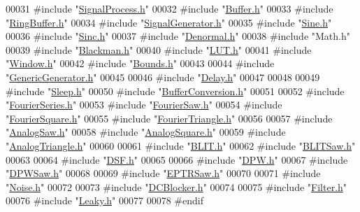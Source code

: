 \begin{DoxyCode}
00031 \textcolor{preprocessor}{#include "\hyperlink{_signal_process_8h}{SignalProcess.h}"}
00032 \textcolor{preprocessor}{#include "\hyperlink{_buffer_8h}{Buffer.h}"}
00033 \textcolor{preprocessor}{#include "\hyperlink{_ring_buffer_8h}{RingBuffer.h}"}
00034 \textcolor{preprocessor}{#include "\hyperlink{_signal_generator_8h}{SignalGenerator.h}"}
00035 \textcolor{preprocessor}{#include "\hyperlink{_sine_8h}{Sine.h}"}
00036 \textcolor{preprocessor}{#include "\hyperlink{_sinc_8h}{Sinc.h}"}
00037 \textcolor{preprocessor}{#include "\hyperlink{_denormal_8h}{Denormal.h}"}
00038 \textcolor{preprocessor}{#include "Math.h"}
00039 \textcolor{preprocessor}{#include "\hyperlink{_blackman_8h}{Blackman.h}"}
00040 \textcolor{preprocessor}{#include "\hyperlink{_l_u_t_8h}{LUT.h}"}
00041 \textcolor{preprocessor}{#include "\hyperlink{_window_8h}{Window.h}"}
00042 \textcolor{preprocessor}{#include "\hyperlink{_bounds_8h}{Bounds.h}"}
00043 
00044 \textcolor{preprocessor}{#include "\hyperlink{_generic_generator_8h}{GenericGenerator.h}"}
00045 
00046 \textcolor{preprocessor}{#include "\hyperlink{_delay_8h}{Delay.h}"}
00047 
00048 
00049 \textcolor{preprocessor}{#include "\hyperlink{_sleep_8h}{Sleep.h}"}
00050 \textcolor{preprocessor}{#include "\hyperlink{_buffer_conversion_8h}{BufferConversion.h}"}
00051 
00052 \textcolor{preprocessor}{#include "\hyperlink{_fourier_series_8h}{FourierSeries.h}"}
00053 \textcolor{preprocessor}{#include "\hyperlink{_fourier_saw_8h}{FourierSaw.h}"}
00054 \textcolor{preprocessor}{#include "\hyperlink{_fourier_square_8h}{FourierSquare.h}"}
00055 \textcolor{preprocessor}{#include "\hyperlink{_fourier_triangle_8h}{FourierTriangle.h}"}
00056 
00057 \textcolor{preprocessor}{#include "\hyperlink{_analog_saw_8h}{AnalogSaw.h}"}
00058 \textcolor{preprocessor}{#include "\hyperlink{_analog_square_8h}{AnalogSquare.h}"}
00059 \textcolor{preprocessor}{#include "\hyperlink{_analog_triangle_8h}{AnalogTriangle.h}"}
00060 
00061 \textcolor{preprocessor}{#include "\hyperlink{_b_l_i_t_8h}{BLIT.h}"}
00062 \textcolor{preprocessor}{#include "\hyperlink{_b_l_i_t_saw_8h}{BLITSaw.h}"}
00063 
00064 \textcolor{preprocessor}{#include "\hyperlink{_d_s_f_8h}{DSF.h}"}
00065 
00066 \textcolor{preprocessor}{#include "\hyperlink{_d_p_w_8h}{DPW.h}"}
00067 \textcolor{preprocessor}{#include "\hyperlink{_d_p_w_saw_8h}{DPWSaw.h}"}
00068 
00069 \textcolor{preprocessor}{#include "\hyperlink{_e_p_t_r_saw_8h}{EPTRSaw.h}"}
00070 
00071 \textcolor{preprocessor}{#include "\hyperlink{_noise_8h}{Noise.h}"}
00072 
00073 \textcolor{preprocessor}{#include "\hyperlink{_d_c_blocker_8h}{DCBlocker.h}"}
00074 
00075 \textcolor{preprocessor}{#include "\hyperlink{_filter_8h}{Filter.h}"}
00076 \textcolor{preprocessor}{#include "\hyperlink{_leaky_8h}{Leaky.h}"}
00077 
00078 \textcolor{preprocessor}{#endif}
\end{DoxyCode}
